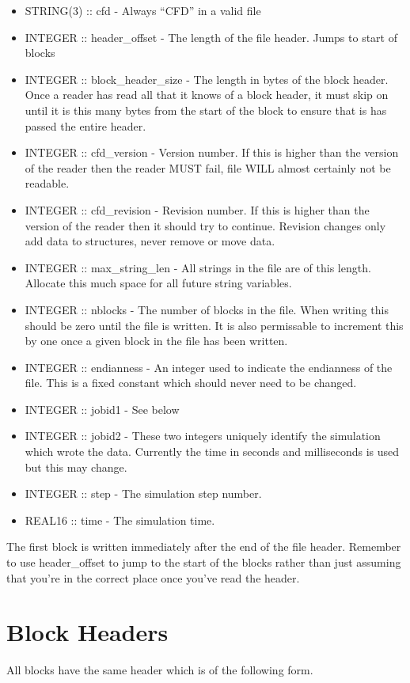 \documentclass[8pt]{article} \usepackage{url,graphicx,tabularx,array}
\begin{document}
\begin{itemize}
\item STRING(3) :: cfd - Always ``CFD'' in a valid file
\item INTEGER :: header\_offset - The length of the file header. Jumps to start
  of blocks
\item INTEGER :: block\_header\_size - The length in bytes of the block
  header. Once a reader has read all that it knows of a block header, it must
  skip on until it is this many bytes from the start of the block to ensure
  that is has passed the entire header.
\item INTEGER :: cfd\_version - Version number. If this is higher than the
  version of the reader then the reader MUST fail, file WILL almost certainly
  not be readable.
\item INTEGER :: cfd\_revision - Revision number. If this is higher than the
  version of the reader then it should try to continue. Revision changes only
  add data to structures, never remove or move data.
\item INTEGER :: max\_string\_len - All strings in the file are of this
  length. Allocate this much space for all future string variables.
\item INTEGER :: nblocks - The number of blocks in the file. When writing this
  should be zero until the file is written. It is also permissable to increment
  this by one once a given block in the file has been written.
\item INTEGER :: endianness - An integer used to indicate the endianness of the
  file. This is a fixed constant which should never need to be changed.
\item INTEGER :: jobid1 - See below
\item INTEGER :: jobid2 - These two integers uniquely identify the simulation
  which wrote the data. Currently the time in seconds and milliseconds is used
  but this may change.
\item INTEGER :: step - The simulation step number.
\item REAL16 :: time - The simulation time.
\end{itemize}

The first block is written immediately after the end of the file
header. Remember to use header\_offset to jump to the start of the blocks
rather than just assuming that you're in the correct place once you've read the
header.

\section{Block Headers}
All blocks have the same header which is of the following form.\\
\end{document}
